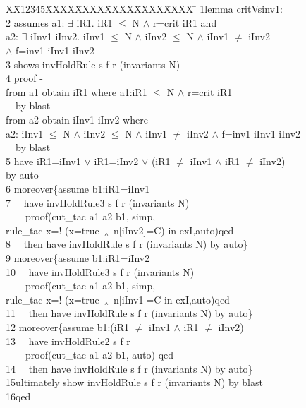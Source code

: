 \documentclass[final]{IEEEtran}
\newlength{\fminilength}
\newenvironment{fmini}[1][\linewidth]
  {\setlength{\fminilength}{#1\fboxsep-2\fboxrule}%
   \vspace{2ex}\noindent\begin{lrbox}{\fminibox}\begin{minipage}{\fminilength}%
   \mbox{ }\hfill\vspace{-2.5ex}}%
  {\end{minipage}\end{lrbox}\vspace{1ex}\hspace{0ex}%
   \framebox{\usebox{\fminibox}}}
\newenvironment{specification}
{\noindent\scriptsize
\tt\begin{fmini}\begin{tabbing}X\=X12345\=XXXX\=XXXX\=XXXX\=XXXX\=XXXX
\=\+\kill} {\end{tabbing}\normalfont\end{fmini}}
\def \twoSpaces {\ \ }
\def \andc {\barwedge }
\def \negc {!}
\def \iInv {iInv}
\def \iR {iR}
\begin{document}
\begin{specification}
1lemma critVsinv1:\\
2  assumes  a1: $\exists$ \iR1. \iR1 $\le$ N $\wedge$ r=crit \iR1 and \\
  a2: $\exists$  \iInv1 \iInv2. \iInv1 $\le$ N $\wedge$ \iInv2 $\le$ N $\wedge$ \iInv1 $\neq$ \iInv2 \\
   $\wedge$ f=inv1  \iInv1 \iInv2\\
3  shows  invHoldRule s f r (invariants
  N)\\
4  proof -\\
   from a1 obtain \iR1 where a1:\iR1 $\le$ N $\wedge$ r=crit \iR1 \\
\twoSpaces   by blast\\
   from a2 obtain \iInv1 \iInv2 where \\
   a2: \iInv1 $\le$ N $\wedge$ \iInv2 $\le$ N $\wedge$ \iInv1 $\neq$ \iInv2 $\wedge$ f=inv1  \iInv1 \iInv2\\
\twoSpaces   by blast \\
5  have iR1=\iInv1 $\vee$ \iR1=\iInv2 $\vee$ (\iR1 $\ne$ \iInv1 $\wedge$  \iR1 $\ne$ \iInv2) \\
  by auto\\

6  moreover\{assume  b1:\iR1=\iInv1\\
7  \twoSpaces have invHoldRule3 s f r (invariants N)\\
 \twoSpaces  \twoSpaces   proof(cut\_tac a1 a2 b1, simp, \\
 rule\_tac x=$\negc$ (x=true $\andc$ n[\iInv2]=C)  in exI,auto)qed\\
8  \twoSpaces then have invHoldRule s f r
(invariants
  N)
by auto\}\\

9  moreover\{assume  b1:iR1=\iInv2\\
10 \twoSpaces have invHoldRule3 s f r (invariants N)\\
 \twoSpaces \twoSpaces   proof(cut\_tac a1 a2 b1, simp, \\
 rule\_tac x=$\negc$ (x=true $\andc$ n[\iInv1]=C  in exI,auto)qed\\
11 \twoSpaces then have invHoldRule s f r (invariants
  N)
by auto\}\\

12   moreover\{assume  b1:(\iR1 $\ne$  \iInv1 $\wedge$   \iR1 $\ne$  \iInv2)\\
13 \twoSpaces have invHoldRule2 s f r  \\
  \twoSpaces \twoSpaces  proof(cut\_tac a1 a2 b1,  auto) qed\\
14 \twoSpaces then have invHoldRule s f r
(invariants
  N)
by auto\} \\

15ultimately show invHoldRule s f r
(invariants N) by blast\\
16qed\\
\end{specification}
\end{document}
